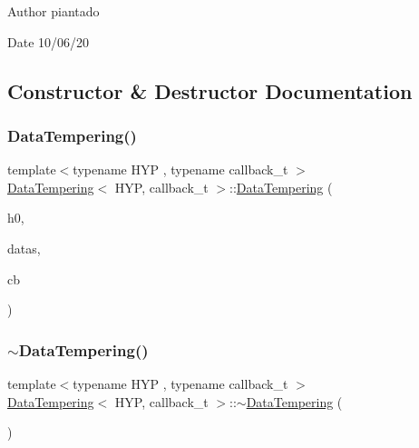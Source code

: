 \begin{DoxyAuthor}{Author}
piantado 
\end{DoxyAuthor}
\begin{DoxyDate}{Date}
10/06/20 
\end{DoxyDate}


\subsection{Constructor \& Destructor Documentation}
\mbox{\label{class_data_tempering_a21a8c93e110fdcebce332300bfea5ece}} 
\subsubsection{\texorpdfstring{Data\+Tempering()}{DataTempering()}}
{\footnotesize\ttfamily template$<$typename H\+YP , typename callback\+\_\+t $>$ \\
\hyperlink{class_data_tempering}{Data\+Tempering}$<$ H\+YP, callback\+\_\+t $>$\+::\hyperlink{class_data_tempering}{Data\+Tempering} (\begin{DoxyParamCaption}\item[{H\+YP \&}]{h0,  }\item[{std\+::vector$<$ typename H\+Y\+P\+::data\+\_\+t $>$ \&}]{datas,  }\item[{std\+::vector$<$ callback\+\_\+t $>$ \&}]{cb }\end{DoxyParamCaption})\hspace{0.3cm}{\ttfamily [inline]}}

\mbox{\label{class_data_tempering_a87d7969c6e9df8682d7912a5ef9cc41a}} 
\subsubsection{\texorpdfstring{$\sim$\+Data\+Tempering()}{~DataTempering()}}
{\footnotesize\ttfamily template$<$typename H\+YP , typename callback\+\_\+t $>$ \\
\hyperlink{class_data_tempering}{Data\+Tempering}$<$ H\+YP, callback\+\_\+t $>$\+::$\sim$\hyperlink{class_data_tempering}{Data\+Tempering} (\begin{DoxyParamCaption}{ }\end{DoxyParamCaption})\hspace{0.3cm}{\ttfamily [inline]}}



